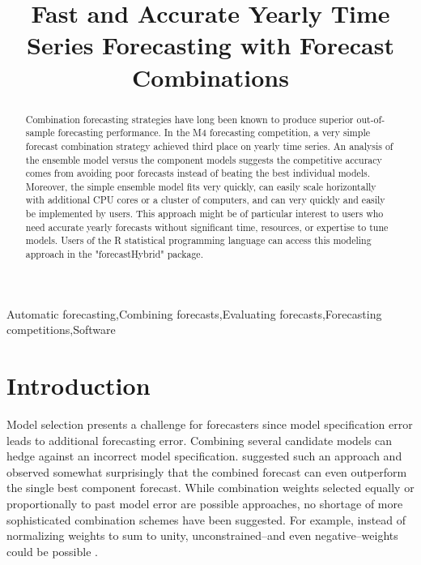 \documentclass[11pt,3p,review,authoryear]{elsarticle}
\begin{document}
\begin{frontmatter}

\title{Fast and Accurate Yearly Time Series Forecasting with Forecast Combinations}





\begin{abstract}
Combination forecasting strategies have long been known to produce superior out-of-sample forecasting performance. In the M4 forecasting competition, a very simple forecast combination strategy achieved third place on yearly time series. An analysis of the ensemble model versus the component models suggests the competitive accuracy comes from avoiding poor forecasts instead of beating the best individual models. Moreover, the simple ensemble model fits very quickly, can easily scale horizontally with additional CPU cores or a cluster of computers, and can very quickly and easily be implemented by users. This approach might be of particular interest to users who need accurate yearly forecasts without significant time, resources, or expertise to tune models. Users of the R statistical programming language can access this modeling approach in the "forecastHybrid" package.
\end{abstract}

\begin{keyword}
Automatic forecasting\sep Combining forecasts\sep Evaluating forecasts\sep Forecasting competitions\sep Software
\end{keyword}

\end{frontmatter}


\section{Introduction}
Model selection presents a challenge for forecasters since model specification error leads to additional forecasting error. Combining several candidate models can hedge against an incorrect model specification. \cite{BatesGranger1969} suggested such an approach and observed somewhat surprisingly that the combined forecast can even outperform the single best component forecast. While combination weights selected equally or proportionally to past model error are possible approaches, no shortage of more sophisticated combination schemes have been suggested. For example, instead of normalizing weights to sum to unity, unconstrained--and even negative--weights could be possible \citep{GrangerRamanathan1984}.
\end{document}
